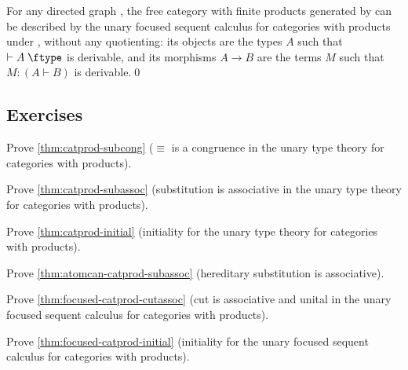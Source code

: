 \documentclass{book}
\let\types\vdash
\def\type{\;\ftype}
\begin{document}
\begin{thm}\label{thm:focused-catprod-initial}
  For any directed graph \cG, the free category with finite products generated by \cG can be described by the unary focused sequent calculus for categories with products under \cG, without any quotienting: its objects are the types $A$ such that $\types A\type$ is derivable, and its morphisms $A\to B$ are the terms $M$ such that $M:(A \types B)$ is derivable.\qed
\end{thm}




\subsection*{Exercises}

\begin{ex}\label{ex:catprod-subcong}
  Prove \cref{thm:catprod-subcong} ($\equiv$ is a congruence in the unary type theory for categories with products).
\end{ex}

\begin{ex}\label{ex:catprod-subassoc}
  Prove \cref{thm:catprod-subassoc} (substitution is associative in the unary type theory for categories with products).
\end{ex}

\begin{ex}\label{ex:catprod-initial}
  Prove \cref{thm:catprod-initial} (initiality for the unary type theory for categories with products).
\end{ex}

\begin{ex}\label{ex:atomcan-catprod-subassoc}
  Prove \cref{thm:atomcan-catprod-subassoc} (hereditary substitution is associative).
\end{ex}

\begin{ex}\label{ex:focused-catprod-cutassoc}
  Prove \cref{thm:focused-catprod-cutassoc} (cut is associative and unital in the unary focused sequent calculus for categories with products).
\end{ex}

\begin{ex}\label{ex:focused-catprod-initial}
  Prove \cref{thm:focused-catprod-initial} (initiality for the unary focused sequent calculus for categories with products).
\end{ex}
\end{document}
